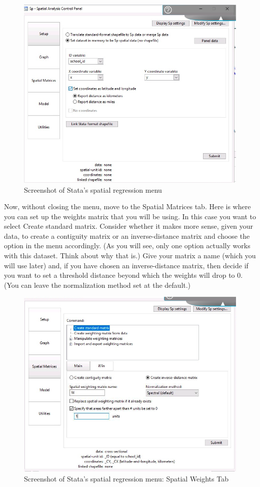 \documentclass[]{book}
\begin{document}
\begin{figure}
\centering
\includegraphics{images/stata_spatial_menu2.png}
\caption{Screenshot of Stata's spatial regression menu}
\end{figure}

Now, without closing the menu, move to the Spatial Matrices tab. Here is where you can set up the weights matrix that you will be using. In this case you want to select Create standard matrix. Consider whether it makes more sense, given your data, to create a contiguity matrix or an inverse-distance matrix and choose the option in the menu accordingly. (As you will see, only one option actually works with this dataset. Think about why that is.) Give your matrix a name (which you will use later) and, if you have chosen an inverse-distance matrix, then decide if you want to set a threshold distance beyond which the weights will drop to 0. (You can leave the normalization method set at the default.)

\begin{figure}
\centering
\includegraphics{images/stata_spatial_weights_menu.png}
\caption{Screenshot of Stata's spatial regression menu: Spatial Weights Tab}
\end{figure}
\end{document}
